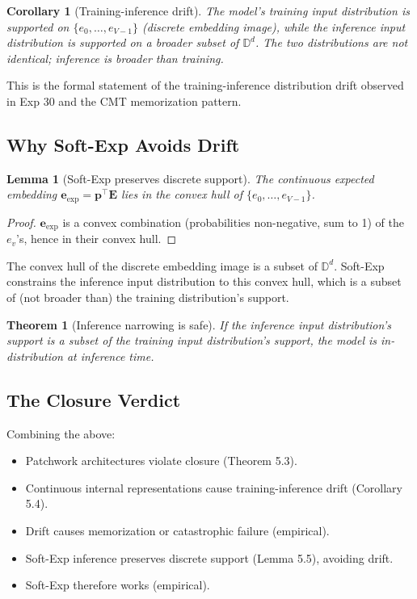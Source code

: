 \documentclass{article}
\newtheorem{theorem}{Theorem}
\newtheorem{lemma}{Lemma}
\newtheorem{corollary}{Corollary}
\begin{document}
\begin{corollary}[Training-inference drift]
The model's training input distribution is supported on $\{e_0, \ldots, e_{V-1}\}$ (discrete embedding image), while the inference input distribution is supported on a broader subset of $\mathbb{D}^d$. The two distributions are not identical; inference is \emph{broader} than training.
\end{corollary}

This is the formal statement of the training-inference distribution drift observed in Exp 30 and the CMT memorization pattern.

\subsection{Why Soft-Exp Avoids Drift}

\begin{lemma}[Soft-Exp preserves discrete support]
The continuous expected embedding $\mathbf{e}_{\text{exp}} = \mathbf{p}^\top \mathbf{E}$ lies in the convex hull of $\{e_0, \ldots, e_{V-1}\}$.
\end{lemma}

\begin{proof}
$\mathbf{e}_{\text{exp}}$ is a convex combination (probabilities non-negative, sum to 1) of the $e_v$'s, hence in their convex hull. \qedhere
\end{proof}

The convex hull of the discrete embedding image is a subset of $\mathbb{D}^d$. Soft-Exp constrains the inference input distribution to this convex hull, which is a subset of (not broader than) the training distribution's support.

\begin{theorem}[Inference narrowing is safe]
If the inference input distribution's support is a subset of the training input distribution's support, the model is in-distribution at inference time.
\end{theorem}

\subsection{The Closure Verdict}

Combining the above:

\begin{itemize}
    \item Patchwork architectures violate closure (Theorem 5.3).
    \item Continuous internal representations cause training-inference drift (Corollary 5.4).
    \item Drift causes memorization or catastrophic failure (empirical).
    \item Soft-Exp inference preserves discrete support (Lemma 5.5), avoiding drift.
    \item Soft-Exp therefore works (empirical).
\end{itemize}
\end{document}
